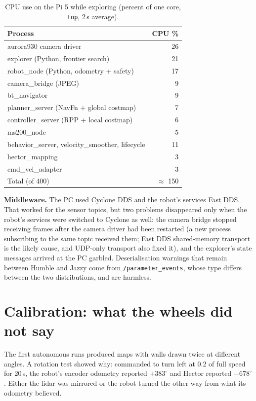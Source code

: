 \documentclass[10pt,twocolumn]{article}
\begin{document}
\begin{table}[t]
\centering\small
\caption{CPU use on the Pi 5 while exploring (percent of one core, \texttt{top}, 2\,s average).}\label{tab:cpu}
\begin{tabular}{@{}lr@{}}
\toprule
Process & CPU \% \\
\midrule
aurora930 camera driver & 26 \\
explorer (Python, frontier search) & 21 \\
robot\_node (Python, odometry + safety) & 17 \\
camera\_bridge (JPEG) & 9 \\
bt\_navigator & 9 \\
planner\_server (NavFn + global costmap) & 7 \\
controller\_server (RPP + local costmap) & 6 \\
ms200\_node & 5 \\
behavior\_server, velocity\_smoother, lifecycle & 11 \\
hector\_mapping & 3 \\
cmd\_vel\_adapter & 3 \\
\midrule
Total (of 400) & $\approx$ 150 \\
\bottomrule
\end{tabular}
\end{table}

\textbf{Middleware.} The PC used Cyclone DDS and the robot's services Fast DDS. That worked for
the sensor topics, but two problems disappeared only when the robot's services were switched to
Cyclone as well: the camera bridge stopped receiving frames after the camera driver had been
restarted (a new process subscribing to the same topic received them; Fast DDS shared-memory
transport is the likely cause, and UDP-only transport also fixed it), and the explorer's state
messages arrived at the PC garbled. Deserialisation warnings that remain between Humble and
Jazzy come from \texttt{/parameter\_events}, whose type differs between the two distributions,
and are harmless.

\section{Calibration: what the wheels did not say}\label{sec:calibration}
The first autonomous runs produced maps with walls drawn twice at different angles. A rotation
test showed why: commanded to turn left at 0.2 of full speed for 20\,s, the robot's encoder
odometry reported $+383^\circ$ and Hector reported $-678^\circ$. Either the lidar was mirrored or
the robot turned the other way from what its odometry believed.
\end{document}
